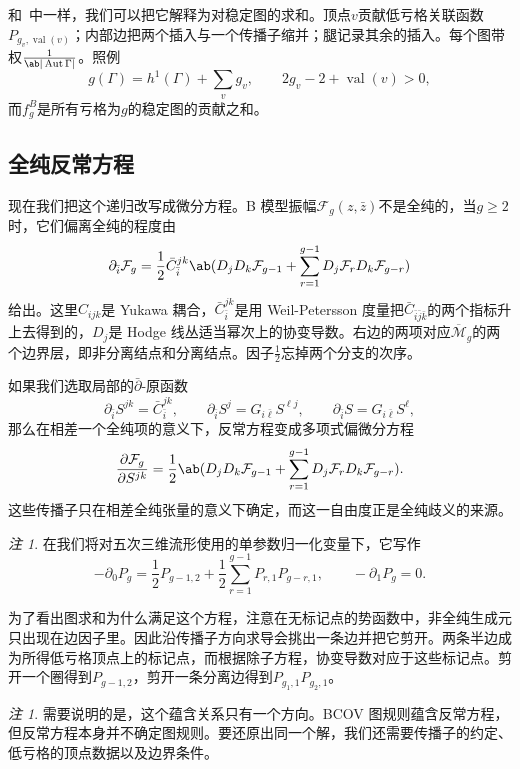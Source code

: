 \documentclass{amsart}
\theoremstyle{definition}
\theoremstyle{remark}
\newtheorem{rmk}[thm]{注}
\theoremstyle{plain}
\theoremstyle{definition}
\theoremstyle{remark}
\newcommand{\Mbar}{\overline{\mathcal{M}}}
\newcommand{\mc}[1]{\mathcal{#1}}
\newcommand{\on}[1]{\operatorname{#1}}
\newcommand{\1}{\mathbf{1}}
\newcommand{\2}{\mathbf{2}}
\newcommand{\3}{\mathbf{3}}
\DeclareMathOperator{\Aut}{Aut}
\begin{document}
和~中一样，我们可以把它解释为对稳定图的求和。顶点\(v\)贡献低亏格关联函数\(P_{g_v, \on{val}(v)}\)；内部边把两个插入与一个传播子缩并；腿记录其余的插入。每个图带权\(\frac{1}{\ab|\Aut \Gamma|}\)。照例
\[ g(\Gamma) = h^1(\Gamma) + \sum_v g_v, \qquad 2g_v - 2 + \on{val}(v) > 0, \]
而\(f_g^B\)是所有亏格为\(g\)的稳定图的贡献之和。

\subsection{全纯反常方程}%
\label{sub:The holomorphic anomaly equation}

现在我们把这个递归改写成微分方程。B 模型振幅\(\mc{F}_g(z,\bar{z})\)不是全纯的，当\(g \geq 2\)时，它们偏离全纯的程度由
\[ \partial_{\bar{i}} \mc{F}_g = \frac{1}{2}\bar{C}_{\bar{i}}^{jk}\ab( D_j D_k \mc{F}_{g-1} + \sum_{r=1}^{g-1} D_j \mc{F}_r D_k \mc{F}_{g-r} ) \]
给出。这里\(C_{ijk}\)是 Yukawa 耦合，\(\bar{C}_{\bar{i}}^{jk}\)是用 Weil-Petersson 度量把\(\bar{C}_{\bar{i}\bar{j}\bar{k}}\)的两个指标升上去得到的，\(D_j\)是 Hodge 线丛适当幂次上的协变导数。右边的两项对应\(\Mbar_g\)的两个边界层，即非分离结点和分离结点。因子\(\frac{1}{2}\)忘掉两个分支的次序。

如果我们选取局部的\(\bar{\partial}\)-原函数
\[ \partial_{\bar{i}}S^{jk} = \bar{C}_{\bar{i}}^{jk}, \qquad \partial_{\bar{i}}S^j = G_{i\bar{\ell}}S^{\ell j}, \qquad \partial_{\bar{i}}S = G_{i\bar{\ell}}S^{\ell}, \]
那么在相差一个全纯项的意义下，反常方程变成多项式偏微分方程
\[ \pdv{\mc{F}_g}{S^{jk}} = \frac{1}{2}\ab( D_jD_k \mc{F}_{g-1} + \sum_{r=1}^{g-1} D_j \mc{F}_r D_k \mc{F}_{g-r} ). \]
这些传播子只在相差全纯张量的意义下确定，而这一自由度正是全纯歧义的来源。

\begin{rmk}
    在我们将对五次三维流形使用的单参数归一化变量下，它写作
    \[ -\partial_0 P_g = \frac{1}{2}P_{g-1,2} + \frac{1}{2}\sum_{r=1}^{g-1}P_{r,1}P_{g-r,1}, \qquad -\partial_1 P_g = 0. \]
\end{rmk}

为了看出图求和为什么满足这个方程，注意在无标记点的势函数中，非全纯生成元只出现在边因子里。因此沿传播子方向求导会挑出一条边并把它剪开。两条半边成为所得低亏格顶点上的标记点，而根据除子方程，协变导数对应于这些标记点。剪开一个圈得到\(P_{g-1,2}\)，剪开一条分离边得到\(P_{g_1,1}P_{g_2,1}\)。

\begin{rmk}
    需要说明的是，这个蕴含关系只有一个方向。BCOV 图规则蕴含反常方程，但反常方程本身并不确定图规则。要还原出同一个解，我们还需要传播子的约定、低亏格的顶点数据以及边界条件。
\end{rmk}
\end{document}

